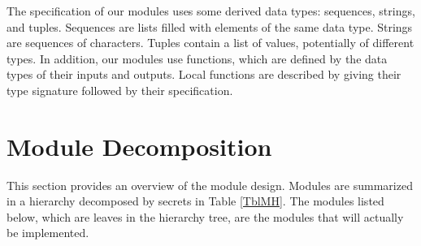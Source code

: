 \documentclass[12pt, titlepage]{article}
\begin{document}
\noindent
The specification of our modules uses some derived data types: sequences, strings, and tuples. Sequences are lists filled with elements of the same data type. Strings are sequences of characters. Tuples contain a list of values, potentially of different types. In addition, our modules use functions, which are defined by the data types of their inputs and outputs. Local functions are described by giving their type signature followed by their specification.

\section{Module Decomposition}

This section provides an overview of the module design. Modules are summarized
in a hierarchy decomposed by secrets in Table \ref{TblMH}. The modules listed
below, which are leaves in the hierarchy tree, are the modules that will
actually be implemented.
\end{document}
